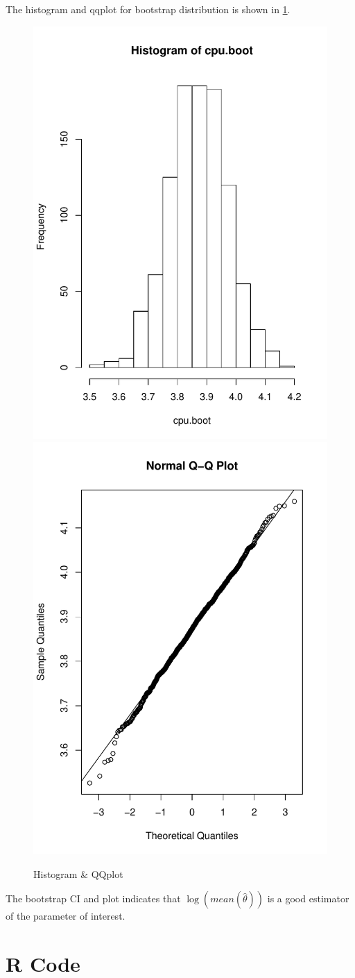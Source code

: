 \documentclass[11pt,letterpaper,titlepage,en-US]{article}
\begin{document}
The histogram and qqplot for bootstrap distribution is shown in \cref{fi}.
\begin{figure}[H]
\includegraphics[width=.49\textwidth]{fig/hist.pdf}
\includegraphics[width=.49\textwidth]{fig/qqplot.pdf}
\caption{Histogram \& QQplot}\label{fi}
\end{figure}

The bootstrap CI and plot indicates that $\log(mean(\hat{\theta}))$ is a good 
estimator of the parameter of interest.

\pagebreak

\section{R Code}


\end{document}
